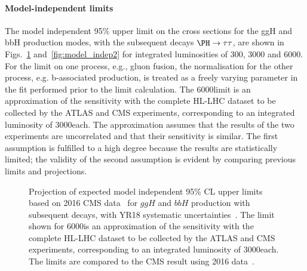 \paragraph{Model-independent limits}
\label{sec:model_indep}
%
The model independent 
95\% \CL upper
limit on the cross sections for the ggH and bbH 
production modes, 
with the subsequent decays $\PH\to\tau\tau$,
are shown in Figs.~\ref{fig:model_indep} and~\ref{fig:model_indep2} for 
integrated luminosities of 300, 3000 and 6000\fbinv. 
For the limit on one process, e.g., gluon fusion, the normalisation for the other process, e.g. b-associated production, is treated as a freely varying parameter in the fit performed prior to the limit calculation.
The 6000\fbinv limit is an approximation of the sensitivity with the complete HL-LHC 
dataset to be collected by the ATLAS and CMS experiments, corresponding to an integrated 
luminosity of 3000\fbinv each. The approximation assumes that the results of the 
two experiments are uncorrelated and that their sensitivity is similar. The first 
assumption is fulfilled to a high degree because the results are statistically limited; 
the validity of the second assumption is evident by comparing previous limits and 
projections. 
%
\begin{figure}[htbp]
\begin{center}
\end{center}
\caption{Projection of expected model independent
  95\% CL upper limits based on 2016 CMS data~\cite{HIG-17-020} for 
$ggH$ and $bbH$ production with subsequent \htt decays, with YR18 systematic 
uncertainties~\cite{CMS-PAS-FTR-18-017}. 
The limit shown for 6000\fbinv is an approximation of the 
sensitivity with the complete HL-LHC dataset to be collected by the ATLAS and 
CMS experiments, corresponding to an integrated luminosity of 3000\fbinv each.
The limits are compared to the CMS result using 2016 data~\cite{HIG-17-020}.}
\label{fig:model_indep}
\end{figure}

